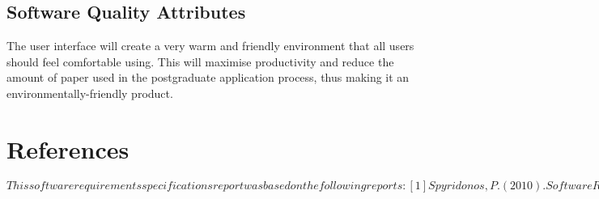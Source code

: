 \documentclass[journal,comsoc,onecolumn]{IEEEtran}
\begin{document}
\subsection{ Software Quality Attributes}
The user interface will create a very warm and friendly environment that all users should feel comfortable using. This will maximise productivity and reduce the amount of paper used in the postgraduate application process, thus making it an environmentally-friendly product.

\section{References}
$This software requirements specifications report was based on the following reports:
[1] Spyridonos, P. (2010). Software Requirements Specification for PDF Split and Merge. Available: http://www.pdfsam.org/uploads/PDFsam-SRS-v2.1.0-EN.pdf. Last accessed 10th March 2016.$








\end{document}
